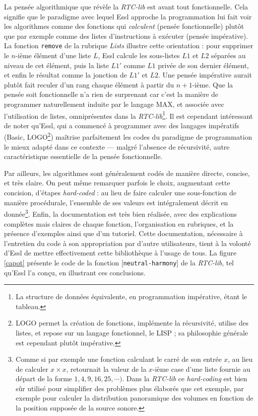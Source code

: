 \documentclass[a4paper,12pt]{article}
\newcommand{\patch}[1]{[\texttt{#1}]}
\begin{document}
La pensée algorithmique que révèle la \emph{RTC-lib} est avant tout fonctionnelle. Cela signifie que le paradigme avec lequel Essl approche la programmation lui fait voir les algorithmes comme des fonctions qui \emph{calculent} (pensée fonctionnelle) plutôt que par exemple comme des listes d'instructions à exécuter (pensée impérative). La fonction \texttt{remove} de la rubrique \emph{Lists} illustre cette orientation : pour supprimer le $n$-ième élément d'une liste $L$, Essl calcule les sous-listes $L1$ et $L2$ séparées au niveau de cet élément, puis la liste $L1'$ comme $L1$ privée de son dernier élément, et enfin le résultat comme la jonction de $L1'$ et $L2$. Une pensée impérative aurait plutôt fait reculer d'un rang chaque élément à partir du $n+1$-ième. Que la pensée soit fonctionnelle n'a rien de surprenant car c'est la manière de programmer naturellement induite par le langage MAX, et associée avec l'utilisation de listes, omniprésentes dans la \emph{RTC-lib}\footnote{La structure de données équivalente, en programmation impérative, étant le tableau.}. Il est cependant intéressant de noter qu'Essl, qui a commencé à programmer avec des langages impératifs (Basic, LOGO\footnote{LOGO permet la création de fonctions, implémente la récursivité, utilise des listes, et repose sur un langage fonctionnel, le LISP ; sa philosophie générale est cependant plutôt impérative.}) maîtrise parfaitement les codes du paradigme de programmation le mieux adapté dans ce contexte --- malgré l'absence de récursivité, autre caractéristique essentielle de la pensée fonctionnelle.

Par ailleurs, les algorithmes sont généralement codés de manière directe, concise, et très claire. On peut même remarquer parfois le choix, augmentant cette concision, d'étapes \emph{hard-coded} : au lieu de faire calculer une sous-fonction de manière procédurale, l'ensemble de ses valeurs est intégralement décrit en donnée\footnote{Comme si par exemple une fonction calculant le carré de son entrée $x$, au lieu de calculer $x\times x$, retournait la valeur de la $x$-ième case d'une liste fournie au départ de la forme $1,4,9,16,25,\cdots)$. Dans la \emph{RTC-lib} ce \emph{hard-coding} est bien sûr utilisé pour simplifier des problèmes plus élaborés que cet exemple, par exemple pour calculer la distribution panoramique des volumes en fonction de la position supposée de la source sonore.}. Enfin, la documentation est très bien réalisée, avec des explications complètes mais claires de chaque fonction, l'organisation en rubriques, et la présence d'exemples ainsi que d'un tutoriel. Cette documentation, nécessaire à l'entretien du code à son appropriation par d'autre utilisateurs, tient à la volonté d'Essl de mettre effectivement cette bibliothèque à l'usage de tous. La figure \ref{capot} présente le code de la fonction \patch{neutral-harmony} de la \emph{RTC-lib}, tel qu'Essl l'a conçu, en illustrant ces conclusions.
\end{document}
